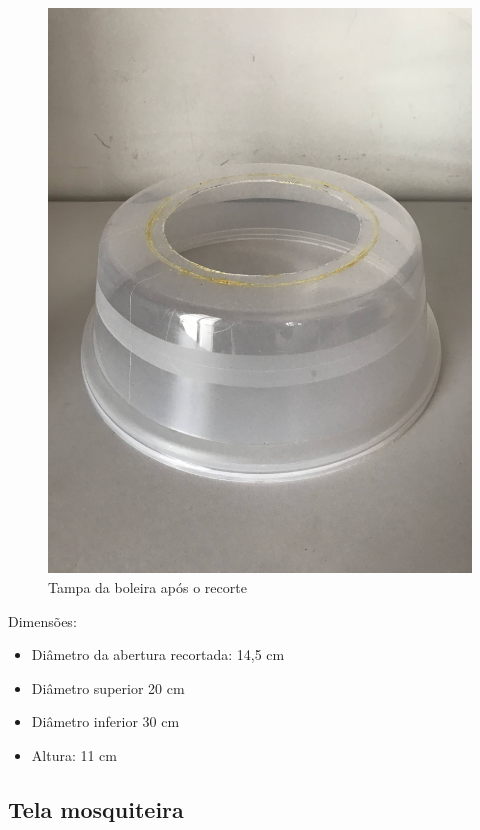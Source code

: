 \documentclass[
	12pt,				%
	openright,			%
	oneside,			%
	a4paper,			%
	chapter=TITLE,		%
	english,			%
	brazil				%
	]{abntex2}
\begin{document}
\begin{figure}[H]
    \centering
    \includegraphics[scale=0.04, angle=-90]{imagens/IMG_0603.jpg}
    \caption{Tampa da boleira após o recorte}
    \label{fig:boleirarecorte}
\end{figure}        
Dimensões: 

\begin{itemize}
    \item Diâmetro da abertura recortada: 14,5 cm
    \item Diâmetro superior 20 cm
    \item Diâmetro inferior 30 cm
    \item Altura: 11 cm
\end{itemize}

\subsection{Tela mosquiteira}
\end{document}
